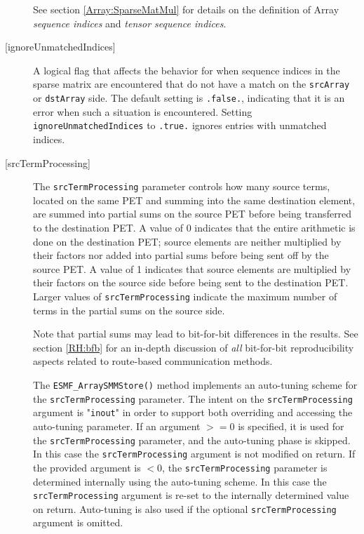 \begin{description}
       See section \ref{Array:SparseMatMul} for details on the definition of 
       Array {\em sequence indices} and {\em tensor sequence indices}.
  
     \item [{[ignoreUnmatchedIndices]}]
       A logical flag that affects the behavior for when sequence indices 
       in the sparse matrix are encountered that do not have a match on the 
       {\tt srcArray} or {\tt dstArray} side. The default setting is 
       {\tt .false.}, indicating that it is an error when such a situation is 
       encountered. Setting {\tt ignoreUnmatchedIndices} to {\tt .true.} ignores
       entries with unmatched indices.
  
     \item [{[srcTermProcessing]}]
       The {\tt srcTermProcessing} parameter controls how many source terms,
       located on the same PET and summing into the same destination element,
       are summed into partial sums on the source PET before being transferred
       to the destination PET. A value of 0 indicates that the entire arithmetic
       is done on the destination PET; source elements are neither multiplied 
       by their factors nor added into partial sums before being sent off by the
       source PET. A value of 1 indicates that source elements are multiplied
       by their factors on the source side before being sent to the destination
       PET. Larger values of {\tt srcTermProcessing} indicate the maximum number
       of terms in the partial sums on the source side.
  
       Note that partial sums may lead to bit-for-bit differences in the results.
       See section \ref{RH:bfb} for an in-depth discussion of {\em all}
       bit-for-bit reproducibility aspects related to route-based communication
       methods.
  
       \begin{sloppypar}
       The {\tt ESMF\_ArraySMMStore()} method implements an auto-tuning scheme
       for the {\tt srcTermProcessing} parameter. The intent on the 
       {\tt srcTermProcessing} argument is "{\tt inout}" in order to 
       support both overriding and accessing the auto-tuning parameter.
       If an argument $>= 0$ is specified, it is used for the 
       {\tt srcTermProcessing} parameter, and the auto-tuning phase is skipped.
       In this case the {\tt srcTermProcessing} argument is not modified on
       return. If the provided argument is $< 0$, the {\tt srcTermProcessing}
       parameter is determined internally using the auto-tuning scheme. In this
       case the {\tt srcTermProcessing} argument is re-set to the internally
       determined value on return. Auto-tuning is also used if the optional 
       {\tt srcTermProcessing} argument is omitted.
       \end{sloppypar}
       

\end{description}
